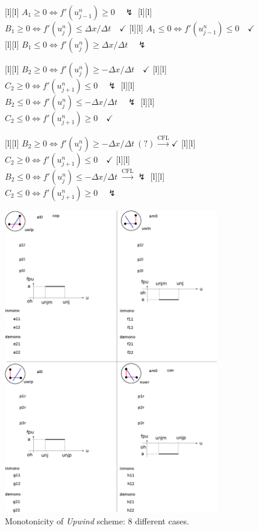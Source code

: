 \begin{figure}[ht]
	[l] {$A_{1}\geq 0 \Leftrightarrow f'(u^{n}_{j-1}) \geq 0\quad \lightning$}
	[l] {$B_{1}\geq 0 \Leftrightarrow f'(u^{n}_{j}) \leq \Delta x/\Delta t \quad \checkmark$}
	[l] {$A_{1}\leq 0 \Leftrightarrow f'(u^{n}_{j-1}) \leq 0\quad \checkmark$}
	[l] {$B_{1}\leq 0 \Leftrightarrow f'(u^{n}_{j}) \geq \Delta x/\Delta t \quad \lightning$}

	[l] {$B_{2}\geq 0 \Leftrightarrow f'(u^{n}_{j})\geq-\Delta x/\Delta t \quad \checkmark$}
	[l] {$C_{2}\geq 0 \Leftrightarrow f'(u^{n}_{j+1}) \leq 0 \quad \lightning$}
	[l] {$B_{2}\leq 0 \Leftrightarrow f'(u^{n}_{j})\leq-\Delta x/\Delta t \quad \lightning$}
	[l] {$C_{2}\leq 0 \Leftrightarrow f'(u^{n}_{j+1}) \geq 0 \quad \checkmark$}

	[l] {$B_{2}\geq 0 \Leftrightarrow f'(u^{n}_{j})\geq-\Delta x/\Delta t \ (?) \stackrel{\text{CFL}}{\rightarrow}\checkmark$}
	[l] {$C_{2}\geq 0 \Leftrightarrow f'(u^{n}_{j+1}) \leq 0 \quad \checkmark$}
	[l] {$B_{2}\leq 0 \Leftrightarrow f'(u^{n}_{j})\leq-\Delta x/\Delta t \ \stackrel{\text{CFL}}{\rightarrow} \lightning$}
	[l] {$C_{2}\leq 0 \Leftrightarrow f'(u^{n}_{j+1}) \geq 0 \quad \lightning$}

	\includegraphics[width=0.83\textwidth]{monotoneUW.eps}
	\caption{Monotonicity of \emph{Upwind} scheme: 8 different cases.}
	\label{\LABEL}
\end{figure}